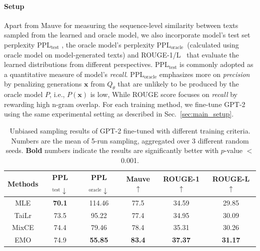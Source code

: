 \paragraph{Setup}
Apart from Mauve for measuring the sequence-level similarity between texts sampled from the learned and oracle model, we also incorporate model's test set perplexity PPL$_{\text{test}}$ , the oracle model's perplexity PPL$_{\text{oracle}}$~(calculated using oracle model on model-generated texts) and ROUGE-1/L~\citep{rouge} that evaluate the learned distributions from different perspectives. PPL$_{\text{test}}$ is commonly adopted as a quantitative measure of model's \textit{recall}. PPL$_{\text{oracle}}$ emphasizes more on \textit{precision} by penalizing generations $\bm{x}$ from $Q_{\theta}$ that are unlikely to be produced by the oracle model $P$, i.e., $P(\bm{x})$ is low, While ROUGE score focuses on \textit{recall} by rewarding high n-gram overlap. For each training method, we fine-tune GPT-2 using the same experimental setting 
as described in Sec.~\ref{sec:main_setup}.
\begin{table}[h!]
    \centering
    \small
    \caption{Unbiased sampling results of GPT-2 fine-tuned with different training criteria. Numbers are the mean of 5-run sampling, aggregated over 3 different random seeds. \textbf{Bold} numbers indicate the results are significantly better with $p$-value $<$ 0.001.}
    \begin{tabular}{cccccc}
    \toprule
    \textbf{Methods} & \textbf{PPL$_{\text{test}}\downarrow$} & \textbf{PPL$_{\text{oracle}}\downarrow$} & \textbf{Mauve$\uparrow$}        & \textbf{ROUGE-1$\uparrow$}       & \textbf{ROUGE-L$\uparrow$}       \\
    \midrule
    MLE   &\textbf{70.1}  & 114.46      & 77.5 & 34.59 & 29.85 \\
    TaiLr &73.5  & 95.22       & 77.4 & 34.95 & 30.09 \\
    MixCE &74.4  & 79.46       & 78.4 & 35.31 & 30.26 \\
    EMO &74.9  & \textbf{55.85}                & \textbf{83.4}          &\textbf{37.37}          & \textbf{31.17}          \\
    \bottomrule
    \end{tabular}
    \label{table:oracle}
\end{table}
